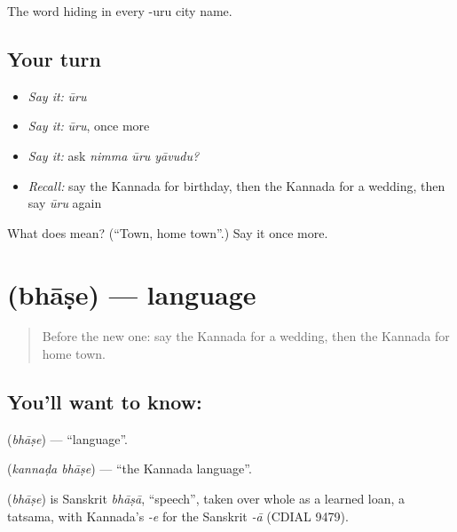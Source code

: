 \begin{grammarlens}[title={What you've built}]
The word hiding in every -uru city name.
\end{grammarlens}

\subsection*{Your turn}
\begin{itemize}
\raggedright
  \item \emph{Say it:} \emph{ūru}
  \item \emph{Say it:} \emph{ūru}, once more
  \item \emph{Say it:} ask \emph{nimma ūru yāvudu?}
  \item \emph{Recall:} say the Kannada for birthday, then the Kannada for a wedding, then say \emph{ūru} again
\end{itemize}

\begin{tcolorbox}[breakable,colback=teal!4,colframe=teal!35!black,title={Before you move on}]
What does  mean? (\textquotedblleft{}Town, home town\textquotedblright{}.) Say it once more.
\end{tcolorbox}
\section[\texorpdfstring{\kn{ಭಾಷೆ} (bhāṣe)}{ಭಾಷೆ (bhāṣe)}]{ (bhāṣe) — language}

\label{lesson:KA-C91-language}



\begin{quote}
Before the new one: say the Kannada for a wedding, then the Kannada for home town.
\end{quote}

\subsection*{You'll want to know: }
\textbf{} (\emph{bhāṣe}) — \textquotedblleft{}language\textquotedblright{}.

\textbf{ } (\emph{kannaḍa bhāṣe}) — \textquotedblleft{}the Kannada language\textquotedblright{}.

\begin{cousinweb}
\textbf{} (\emph{bhāṣe}) is Sanskrit \emph{bhāṣā}, \textquotedblleft{}speech\textquotedblright{}, taken over whole as a learned loan, a tatsama, with Kannada's \emph{-e} for the Sanskrit \emph{-ā} (CDIAL 9479).
\end{cousinweb}

